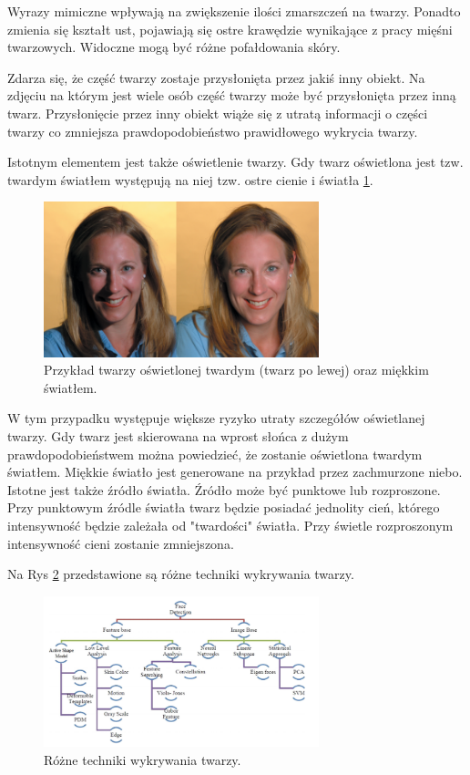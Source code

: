\documentclass[a4paper,twoside,12pt]{book}
\begin{document}
    Wyrazy mimiczne wpływają na zwiększenie ilości zmarszczeń na twarzy.
    Ponadto zmienia się kształt ust, pojawiają się ostre krawędzie wynikające z pracy mięśni twarzowych.
    Widoczne mogą być różne pofałdowania skóry.

    Zdarza się, że część twarzy zostaje przysłonięta przez jakiś inny obiekt.
    Na zdjęciu na którym jest wiele osób część twarzy może być przysłonięta przez inną twarz.
    Przysłonięcie przez inny obiekt wiąże się z utratą informacji o części twarzy co zmniejsza prawdopodobieństwo
    prawidłowego wykrycia twarzy.

    Istotnym elementem jest także oświetlenie twarzy.
    Gdy twarz oświetlona jest tzw. twardym światłem występują na
    niej tzw. ostre cienie i światła \ref{fig.oswietlenieTwarzy}.
    \begin{figure}
        \centering
        \includegraphics[width=8cm]{Obrazy/oswietlenieTwarzy.jpg}
        \caption{Przykład twarzy oświetlonej twardym (twarz po lewej) oraz miękkim światłem. \cite{oswietlenieTwarzy}}
        \label{fig.oswietlenieTwarzy}
    \end{figure}
    W tym przypadku występuje większe ryzyko utraty szczegółów oświetlanej twarzy.
    Gdy twarz jest skierowana na wprost słońca z dużym
    prawdopodobieństwem można powiedzieć, że zostanie oświetlona twardym światłem.
    Miękkie światło jest generowane na przykład przez zachmurzone niebo.
    Istotne jest także źródło światła.
    Źródło może być punktowe lub rozproszone.
    Przy punktowym źródle światła twarz będzie
    posiadać jednolity cień, którego intensywność będzie zależała od "twardości" światła.
    Przy świetle rozproszonym intensywność cieni zostanie zmniejszona.

    Na Rys \ref{fig.technikiWykrywaniaTwarzy} przedstawione są różne techniki wykrywania twarzy.
    \begin{figure}
        \centering
        \includegraphics[width=8cm]{Obrazy/technikiWykrywaniaTwarzy.jpg}
        \caption{Różne techniki wykrywania twarzy. \cite{faceDetectionTechniques}}
        \label{fig.technikiWykrywaniaTwarzy}
    \end{figure}
\end{document}
